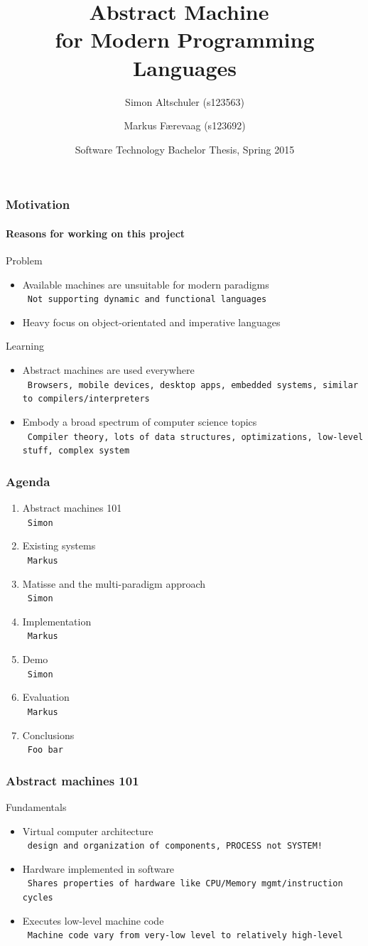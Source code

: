 \documentclass{beamer}
\title{Abstract Machine~\\for Modern Programming Languages}
\author[Altschuler, Færevaag]{Simon Altschuler (s123563) \and Markus Færevaag (s123692)}
\date{Software Technology Bachelor Thesis, Spring 2015}
\newcommand{\n}[1]{\leavevmode\\~\texttt{\color{red}\tiny #1}}
\begin{document}
\frame{\titlepage}

\begin{frame}
  \frametitle{Motivation}
  \framesubtitle{Reasons for working on this project}

  Problem
  \begin{itemize}
  \item Available machines are unsuitable for modern paradigms
    \n{Not supporting dynamic and functional languages}
  \item Heavy focus on object-orientated and imperative languages
  \end{itemize}

  \pause{}

  \vspace{20pt}
  Learning
  \begin{itemize}
  \item Abstract machines are used everywhere
    \n{Browsers, mobile devices, desktop apps, embedded systems, similar to compilers/interpreters}
  \item Embody a broad spectrum of computer science topics
    \n{Compiler theory, lots of data structures, optimizations, low-level stuff, complex system}
  \end{itemize}

\end{frame}

\begin{frame}
  \frametitle{Agenda}
  \fontsize{11pt}{20}\selectfont
  \begin{enumerate}[<+->]
  \item Abstract machines 101
    \n{Simon}
  \item Existing systems
    \n{Markus}
  \item Matisse and the multi-paradigm approach
    \n{Simon}
  \item Implementation
    \n{Markus}
  \item Demo
    \n{Simon}
  \item Evaluation
    \n{Markus}
  \item Conclusions
    \n{Foo bar}
  \end{enumerate}
\end{frame}

\begin{frame}
  \frametitle{Abstract machines 101}

  Fundamentals

  \begin{itemize}[<+->]
  \item Virtual computer architecture
    \n{design and organization of components, PROCESS not SYSTEM!}
  \item Hardware implemented in software
    \n{Shares properties of hardware like CPU/Memory mgmt/instruction cycles}
  \item Executes low-level machine code
    \n{Machine code vary from very-low level to relatively high-level}
  \end{itemize}

\end{frame}
\end{document}
